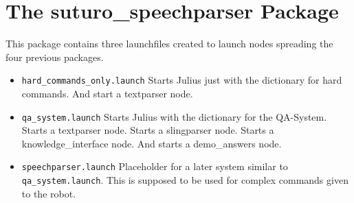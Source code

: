 \documentclass[main.tex]{subfiles}
\begin{document}
\section{The suturo\_speechparser Package}
    This package contains three launchfiles created to launch nodes spreading the four previous packages.\\
    \begin{itemize}
        \item \texttt{hard\_commands\_only.launch}
            \subitem Starts Julius just with the dictionary for hard commands.
            \subitem And start a textparser node.
        \item \texttt{qa\_system.launch}
            \subitem Starts Julius with the dictionary for the QA-System.
            \subitem Starts a textparser node.
            \subitem Starts a slingparser node.
            \subitem Starts a knowledge\_interface node.
            \subitem And starts a demo\_answers node.        
        \item \texttt{speechparser.launch}
            \subitem Placeholder for a later system similar to \texttt{qa\_system.launch}. This is supposed to be used for complex commands given to the robot.  
        
    \end{itemize}
     
    	
\end{document}
